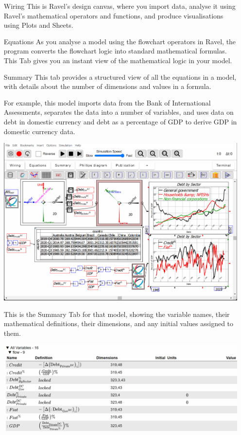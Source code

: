 \begin{itemize}
\item[Wiring]
This is Ravel's design canvas, where you import data, analyse it using Ravel's mathematical operators and functions, and produce visualisations using Plots and Sheets.
\item[Equations]
As you analyse a model using the flowchart operators in Ravel, the program converts the flowchart logic into standard mathematical formulas. This Tab gives you an instant view of the mathematical logic in your model.
\item[Summary]
This tab provides a structured view of all the equations in a model, with details about the number of dimensions and values in a formula.

For example, this model imports data from the Bank of International Assessments, separates the data into a number of variables, and uses data on debt in domestic currency and debt as a percentage of GDP to derive GDP in domestic currency data.

\includegraphics{images/DebtCalcGDPexample.png}

This is the Summary Tab for that model, showing the variable names, their mathematical definitions, their dimensions, and any initial values assigned to them.

\includegraphics{images/DebtCalcGDPexampleSummaryTab.png}


\end{itemize}
